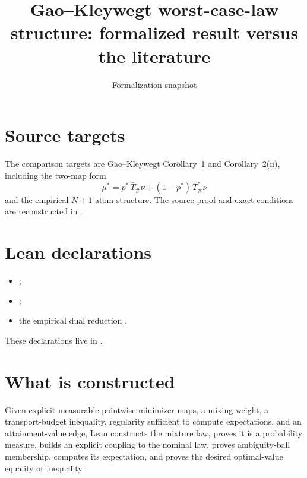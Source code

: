 \title{Gao--Kleywegt worst-case-law structure: formalized result versus the literature}
\author{}
\date{Formalization snapshot \snapshot}

\maketitle
{}
\section{Source targets}
The comparison targets are Gao--Kleywegt Corollary~1 and Corollary~2(ii), including the two-map form
\[
 \mu^*=p^*\,\bar T_\#\nu+(1-p^*)\,T^*_\#\nu
\]
and the empirical $N+1$-atom structure.  The source proof and exact conditions are reconstructed in
.

\section{Lean declarations}
\begin{itemize}[leftmargin=2em]
\item {};
\item {};
\item the empirical dual reduction .
\end{itemize}
These declarations live in .

\section{What is constructed}
Given explicit measurable pointwise minimizer maps, a mixing weight, a transport-budget inequality, regularity sufficient to compute expectations, and an attainment-value edge, Lean constructs the mixture law, proves it is a probability measure, builds an explicit coupling to the nominal law, proves ambiguity-ball membership, computes its expectation, and proves the desired optimal-value equality or inequality.

